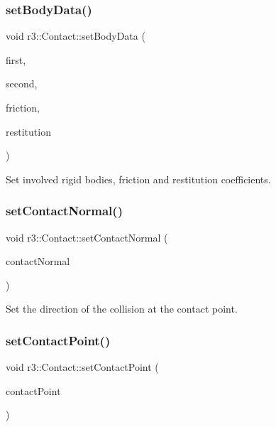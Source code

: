 \subsubsection{\texorpdfstring{set\+Body\+Data()}{setBodyData()}}
{\footnotesize\ttfamily void r3\+::\+Contact\+::set\+Body\+Data (\begin{DoxyParamCaption}\item[{\mbox{\hyperlink{classr3_1_1_rigid_body}{Rigid\+Body}} $\ast$}]{first,  }\item[{\mbox{\hyperlink{classr3_1_1_rigid_body}{Rigid\+Body}} $\ast$}]{second,  }\item[{\mbox{\hyperlink{namespacer3_ab2016b3e3f743fb735afce242f0dc1eb}{real}}}]{friction,  }\item[{\mbox{\hyperlink{namespacer3_ab2016b3e3f743fb735afce242f0dc1eb}{real}}}]{restitution }\end{DoxyParamCaption})}

Set involved rigid bodies, friction and restitution coefficients. \mbox{\label{classr3_1_1_contact_af7866e211b169ce6565d3f37af8ef8d7}} 
\subsubsection{\texorpdfstring{set\+Contact\+Normal()}{setContactNormal()}}
{\footnotesize\ttfamily void r3\+::\+Contact\+::set\+Contact\+Normal (\begin{DoxyParamCaption}\item[{const glm\+::vec3 \&}]{contact\+Normal }\end{DoxyParamCaption})}

Set the direction of the collision at the contact point. \mbox{\label{classr3_1_1_contact_aedd044892a1adf0692b7cc9f81b4436a}} 
\subsubsection{\texorpdfstring{set\+Contact\+Point()}{setContactPoint()}}
{\footnotesize\ttfamily void r3\+::\+Contact\+::set\+Contact\+Point (\begin{DoxyParamCaption}\item[{const glm\+::vec3 \&}]{contact\+Point }\end{DoxyParamCaption})}

